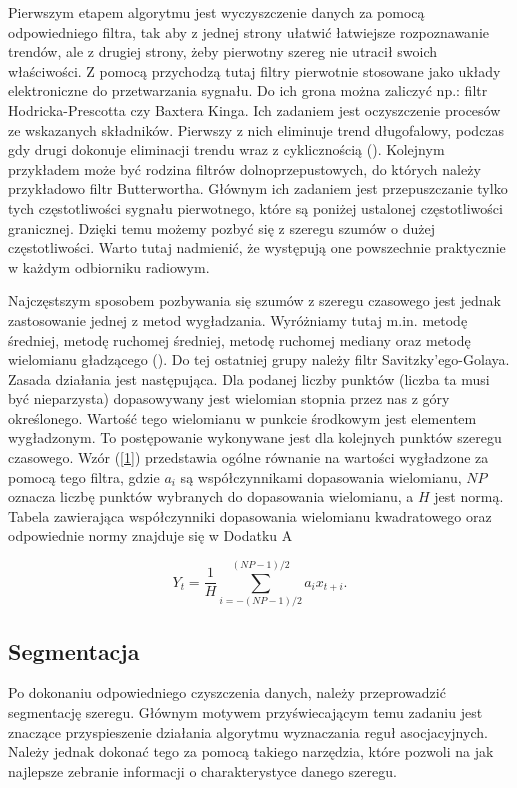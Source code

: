 \documentclass[polish, twoside, 12pt, a4paper]{article}
\theoremstyle{definition}
\theoremstyle{plain}
\theoremstyle{remark}
\begin{document}
Pierwszym etapem algorytmu jest wyczyszczenie danych za pomocą odpowiedniego filtra, tak aby z jednej strony ułatwić łatwiejsze rozpoznawanie trendów, ale z drugiej strony, żeby pierwotny szereg nie utracił swoich właściwości. Z pomocą przychodzą 
tutaj filtry pierwotnie stosowane jako układy elektroniczne do przetwarzania sygnału. Do ich grona można zaliczyć np.: filtr Hodricka-Prescotta czy Baxtera Kinga. Ich zadaniem jest oczyszczenie procesów ze wskazanych składników. Pierwszy z nich eliminuje 
trend długofalowy, podczas gdy drugi dokonuje eliminacji trendu wraz z cyklicznością (\cite{Kufel2005}). Kolejnym przykładem może być rodzina filtrów dolnoprzepustowych, do których należy przykładowo filtr Butterwortha. Głównym ich zadaniem jest 
przepuszczanie tylko tych częstotliwości sygnału pierwotnego, które są poniżej ustalonej częstotliwości granicznej. Dzięki temu możemy pozbyć się z szeregu szumów o dużej częstotliwości. Warto tutaj nadmienić, że występują one powszechnie praktycznie 
w każdym odbiorniku radiowym. 

Najczęstszym sposobem pozbywania się szumów z szeregu czasowego jest jednak zastosowanie jednej z metod wygładzania. Wyróżniamy tutaj m.in. metodę średniej, metodę ruchomej średniej, metodę ruchomej mediany oraz metodę wielomianu 
gładzącego (\cite{Huk2001}). Do tej ostatniej grupy należy filtr Savitzky'ego-Golaya. Zasada działania jest następująca. Dla podanej liczby punktów (liczba ta musi być nieparzysta) dopasowywany jest wielomian stopnia przez nas z góry określonego. 
Wartość tego wielomianu w punkcie środkowym jest elementem wygładzonym. To postępowanie wykonywane jest dla kolejnych punktów szeregu czasowego. Wzór (\ref{1}) przedstawia ogólne równanie na wartości wygładzone za pomocą tego filtra, 
gdzie \(a_{i}\) są współczynnikami dopasowania wielomianu, \(NP\) oznacza liczbę punktów wybranych do dopasowania wielomianu, a \(H\) jest normą. Tabela zawierająca współczynniki dopasowania wielomianu kwadratowego oraz odpowiednie normy 
znajduje się w Dodatku A 

\begin{equation}\label{1}
Y_{t}=\frac{1}{H}\sum_{i=-(NP-1)/2}^{(NP-1)/2} a_{i}x_{t+i}.
\end{equation}

\subsection{Segmentacja}

Po dokonaniu odpowiedniego czyszczenia danych, należy przeprowadzić segmentację szeregu. Głównym motywem przyświecającym temu zadaniu jest znaczące przyspieszenie działania algorytmu wyznaczania reguł asocjacyjnych. Należy jednak dokonać tego za pomocą takiego narzędzia, które pozwoli na jak najlepsze zebranie informacji o charakterystyce danego szeregu. 
\end{document}
